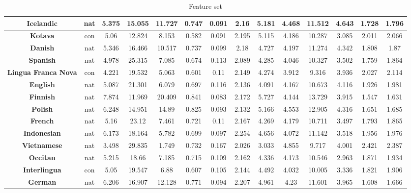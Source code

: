 \documentclass[12pt,a4paper]{article}
\numberwithin{figure}{section}
\numberwithin{table}{section}
\numberwithin{definition}{section}
\begin{document}
\begin{table}[h!]
\begin{tabular}{|c|c|c|c|c|c|c|c|c|c|c|c|c|c|}
          \textbf{Icelandic} & nat & 5.375 & 15.055 & 11.727 & 0.747 & 0.091 & 2.16 & 5.181 & 4.468 & 11.512 & 4.643 & 1.728 & 1.796 \\ \hline
          \textbf{Kotava} & con & 5.06 & 12.824 & 8.153 & 0.582 & 0.091 & 2.195 & 5.115 & 4.186 & 10.287 & 3.085 & 2.011 & 2.066 \\ \hline
          \textbf{Danish} & nat & 5.346 & 16.466 & 10.517 & 0.737 & 0.099 & 2.18 & 4.727 & 4.197 & 11.274 & 4.342 & 1.808 & 1.87 \\ \hline
          \textbf{Spanish} & nat & 4.978 & 25.315 & 7.085 & 0.674 & 0.113 & 2.089 & 4.285 & 4.046 & 10.327 & 3.502 & 1.759 & 1.864 \\ \hline
          \textbf{Lingua Franca Nova} & con & 4.221 & 19.532 & 5.063 & 0.601 & 0.11 & 2.149 & 4.274 & 3.912 & 9.316 & 3.936 & 2.027 & 2.114 \\ \hline
          \textbf{English} & nat & 5.087 & 21.301 & 6.079 & 0.697 & 0.116 & 2.136 & 4.091 & 4.167 & 10.673 & 4.116 & 1.926 & 1.981 \\ \hline
          \textbf{Finnish} & nat & 7.874 & 11.969 & 20.409 & 0.841 & 0.083 & 2.172 & 5.727 & 4.144 & 13.729 & 3.915 & 1.547 & 1.631 \\ \hline
          \textbf{Polish} & nat & 6.248 & 14.951 & 14.89 & 0.825 & 0.093 & 2.132 & 5.166 & 4.553 & 12.905 & 4.316 & 1.651 & 1.685 \\ \hline
          \textbf{French} & nat & 5.16 & 23.12 & 7.461 & 0.721 & 0.11 & 2.167 & 4.269 & 4.179 & 10.711 & 3.497 & 1.793 & 1.865 \\ \hline
          \textbf{Indonesian} & nat & 6.173 & 18.164 & 5.782 & 0.699 & 0.097 & 2.254 & 4.656 & 4.072 & 11.142 & 3.518 & 1.956 & 1.976 \\ \hline
          \textbf{Vietnamese} & nat & 3.498 & 29.835 & 1.749 & 0.732 & 0.167 & 2.026 & 3.033 & 4.855 & 9.717 & 4.001 & 2.421 & 2.387 \\ \hline
          \textbf{Occitan} & nat & 5.215 & 18.66 & 7.185 & 0.715 & 0.109 & 2.162 & 4.336 & 4.173 & 10.546 & 2.963 & 1.871 & 1.934 \\ \hline
          \textbf{Interlingua} & con & 5.05 & 19.547 & 6.88 & 0.607 & 0.105 & 2.144 & 4.492 & 4.032 & 10.005 & 3.336 & 1.821 & 1.906 \\ \hline
          \textbf{German} & nat & 6.206 & 16.907 & 12.128 & 0.771 & 0.094 & 2.207 & 4.961 & 4.23 & 11.601 & 3.965 & 1.608 & 1.666 \\ \hline       
  \end{tabular}
  \caption{Feature set}
  \label{tbl:featurestable}
\end{table}
\end{document}
